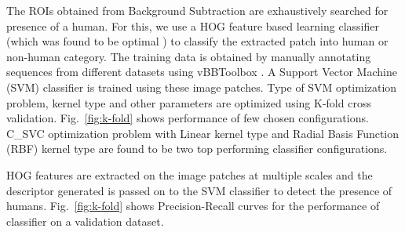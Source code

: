 \documentclass[runningheads]{llncs}
\begin{document}
The ROIs obtained from Background Subtraction are exhaustively searched for presence of a human. For this, we use a HOG feature based learning classifier (which was found to be optimal \cite{portmann2014people}) to classify the extracted patch into human or non-human category. The training data is obtained by manually annotating sequences from different datasets using vBBToolbox \cite{PMT}. A Support Vector Machine (SVM) classifier is trained using these image patches. Type of SVM optimization problem, kernel type and other parameters are optimized using K-fold cross validation. Fig.~\ref{fig:k-fold} shows performance of few chosen configurations. C\_SVC \cite{svm} optimization problem with Linear kernel type and Radial Basis Function (RBF) kernel type are found to be two top performing classifier configurations. 

HOG features are extracted on the image patches at multiple scales and the descriptor generated is passed on to the SVM classifier to detect the presence of humans. Fig.~\ref{fig:k-fold} shows Precision-Recall curves for the performance of classifier on a validation dataset.
\end{document}
